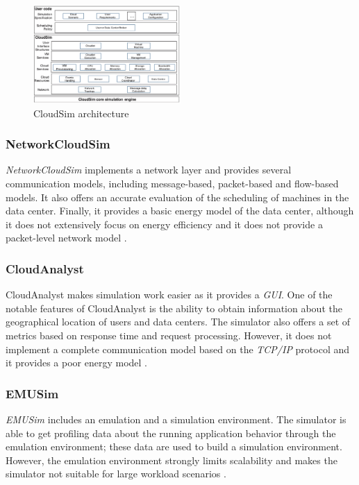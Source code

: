 {\begin{itemize}
\end{itemize}
\begin{figure}[h]
    \centering
    \includegraphics[width=0.5\textwidth]{chapters/images/cloudsim_arch.jpeg}
    \caption{CloudSim architecture}
    \label{fig:cloudsim_arch}
\end{figure}
\subsubsection{NetworkCloudSim}
\emph{NetworkCloudSim} \cite{garg2011networkcloudsim} implements a network layer and  provides several communication models, including message-based, packet-based and flow-based models. It also offers an accurate evaluation of the scheduling of machines in the data center. Finally, it provides a basic energy model of the data center, although it does not extensively focus on energy efficiency and it does not provide a packet-level network model \cite{mansouri2020cloud} \cite{patel2016comprehensive}.
\subsubsection*{CloudAnalyst}
CloudAnalyst \cite{wickremasinghe2010cloudanalyst} makes simulation work easier as it provides a \emph{GUI}. One of the notable features of CloudAnalyst is the ability to obtain information about the geographical location of users and data centers. The simulator also offers a set of metrics based on response time and request processing. However, it does not implement a complete communication model based on the \emph{TCP/IP} protocol and it provides a poor energy model \cite{mansouri2020cloud}. 
\subsubsection{EMUSim}
\emph{EMUSim} \cite{calheiros2013emusim} includes an emulation and a simulation environment. The simulator is able to get profiling data about the running application behavior through the emulation environment; these data are used to build a simulation environment. However, the emulation environment strongly limits scalability and makes the simulator not suitable for large workload scenarios \cite{mansouri2020cloud}. 
}
